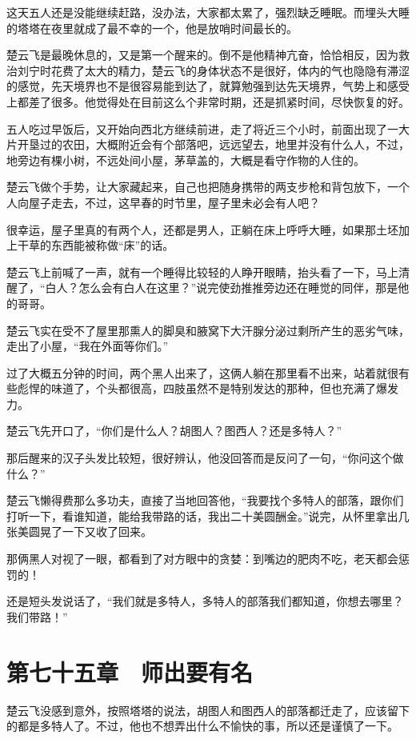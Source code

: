 这天五人还是没能继续赶路，没办法，大家都太累了，强烈缺乏睡眠。而埋头大睡的塔塔在夜里就成了最不幸的一个，他是放哨时间最长的。

楚云飞是最晚休息的，又是第一个醒来的。倒不是他精神亢奋，恰恰相反，因为救治刘宁时花费了太大的精力，楚云飞的身体状态不是很好，体内的气也隐隐有滞涩的感觉，先天境界也不是很容易能到达了，就算勉强到达先天境界，气势上和感受上都差了很多。他觉得处在目前这么个非常时期，还是抓紧时间，尽快恢复的好。

五人吃过早饭后，又开始向西北方继续前进，走了将近三个小时，前面出现了一大片开垦过的农田，大概附近会有个部落吧，远远望去，地里并没有什么人，不过，地旁边有棵小树，不远处间小屋，茅草盖的，大概是看守作物的人住的。

楚云飞做个手势，让大家藏起来，自己也把随身携带的两支步枪和背包放下，一个人向屋子走去，不过，这早春的时节里，屋子里未必会有人吧？

很幸运，屋子里真的有两个人，还都是男人，正躺在床上呼呼大睡，如果那土坯加上干草的东西能被称做“床”的话。

楚云飞上前喊了一声，就有一个睡得比较轻的人睁开眼睛，抬头看了一下，马上清醒了，“白人？怎么会有白人在这里？”说完使劲推推旁边还在睡觉的同伴，那是他的哥哥。

楚云飞实在受不了屋里那熏人的脚臭和腋窝下大汗腺分泌过剩所产生的恶劣气味，走出了小屋，“我在外面等你们。”

过了大概五分钟的时间，两个黑人出来了，这俩人躺在那里看不出来，站着就很有些彪悍的味道了，个头都很高，四肢虽然不是特别发达的那种，但也充满了爆发力。

楚云飞先开口了，“你们是什么人？胡图人？图西人？还是多特人？”

那后醒来的汉子头发比较短，很好辨认，他没回答而是反问了一句，“你问这个做什么？”

楚云飞懒得费那么多功夫，直接了当地回答他，“我要找个多特人的部落，跟你们打听一下，看谁知道，能给我带路的话，我出二十美圆酬金。”说完，从怀里拿出几张美圆晃了一下又收了回来。

那俩黑人对视了一眼，都看到了对方眼中的贪婪：到嘴边的肥肉不吃，老天都会惩罚的！

还是短头发说话了，“我们就是多特人，多特人的部落我们都知道，你想去哪里？我们带路！”

\section{第七十五章　师出要有名}

楚云飞没感到意外，按照塔塔的说法，胡图人和图西人的部落都迁走了，应该留下的都是多特人了。不过，他也不想弄出什么不愉快的事，所以还是谨慎了一下。

